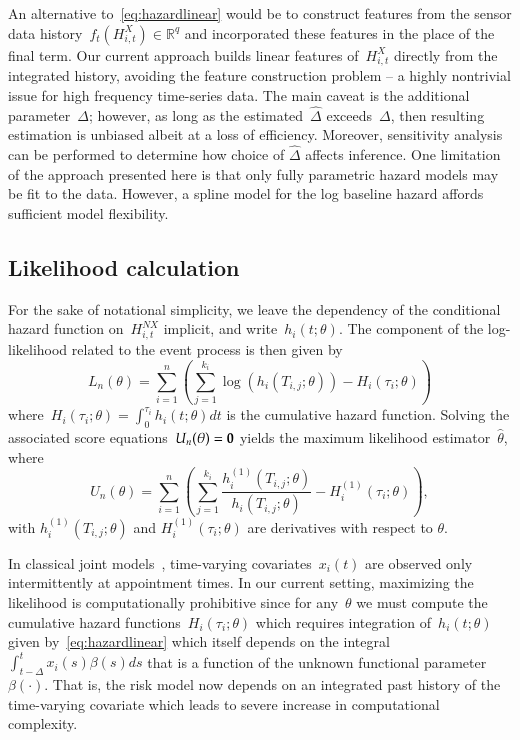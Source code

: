 \documentclass[12pt]{amsart}
\begin{document}
An alternative to~\eqref{eq:hazardlinear} would be to construct features from the sensor data history~$f_t ( H_{i,t}^{X}) \in \mathbb{R}^q$ and incorporated these features in the place of the final term. Our current approach builds linear features of~$H_{i,t}^X$ directly from the integrated history, avoiding the feature construction problem -- a highly nontrivial issue for high frequency time-series data.  The main caveat is the additional parameter~$\Delta$; however, as long as the estimated~$\hat \Delta$ exceeds~$\Delta$, then resulting estimation is unbiased albeit at a loss of efficiency.  Moreover, sensitivity analysis can be performed to determine how choice of $\hat \Delta$ affects inference.  One limitation of the approach presented here is that only fully parametric hazard models may be fit to the data. However, a spline model for the log baseline hazard affords sufficient model flexibility.

\subsection{Likelihood calculation}

For the sake of notational simplicity, we leave the dependency of the conditional hazard function on~$H_{i,t}^{NX}$ implicit, and write~$h_i (t; \theta)$. The component of the log-likelihood related to the event process is then given by
\[
  L_n (\theta) = \sum_{i=1}^{n} \left ( \sum_{j=1}^{k_i}
    \log \left( h_i \left( T_{i,j}; \theta
      \right) \right) - H_{i} \left( \tau_i; \theta \right) \right)
\]
where~$H_{i} (\tau_i ; \theta) = \int_{0}^{\tau_i} h_{i} (t; \theta) dt$ is the cumulative hazard function. Solving the associated score equations~$U_n (\theta) = {\bf 0}$ yields the maximum likelihood estimator~$\hat \theta$, where
\[
U_n (\theta) = \sum_{i=1}^{n} \left ( \sum_{j=1}^{k_i} \frac{h^{(1)}_i
    (T_{i,j}; \theta)}{h_i (T_{i,j}; \theta)} - H^{(1)}_{i} (\tau_i;
  \theta) \right),
\]
with $h_i^{(1)} (T_{i,j}; \theta)$ and $H_i^{(1)} (\tau_{i}; \theta)$ are derivatives with respect to $\theta$.

In classical joint models~\citep{Henderson2000, Tsiatis2004}, time-varying covariates~$x_i (t)$ are observed only intermittently at appointment times. In our current setting, maximizing the likelihood is computationally prohibitive since for any~$\theta$ we must compute the cumulative hazard functions~$H_{i} (\tau_i; \theta)$ which requires integration of~$h_i(t;\theta)$ given by~\eqref{eq:hazardlinear} which itself depends on the integral~$\int_{t-\Delta}^t x_i (s) \beta(s) ds$ that is a function of the unknown functional parameter $\beta(\cdot)$.  That is, the risk model now depends on an integrated past history of the time-varying covariate which leads to severe increase in computational complexity.
\end{document}
